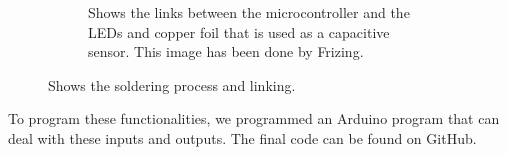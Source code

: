 \documentclass[doc.tex]{subfiles}
\begin{document}
\begin{figure}[H]
\begin{subfigure}{.45\textwidth}
            \caption{Shows the links between the microcontroller and the LEDs and copper foil that is 
            used as a capacitive sensor. This image has been done by Frizing. \cite{fritzing}}
            \label{fig:solderingProcess_3}
            \vspace{6mm}
        \end{subfigure}
        \caption{Shows the soldering process and linking.}
        \label{fig:solderingProcess}
    \end{figure}

    \noindent
    To program these functionalities, we programmed an Arduino program that can deal with these inputs 
    and outputs. The final code can be found on GitHub. %
\end{document}
